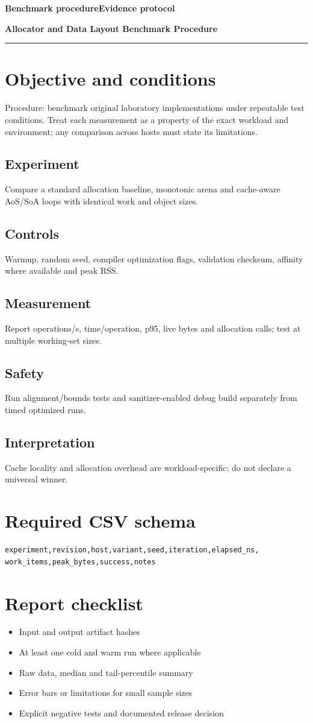\documentclass[11pt,letterpaper]{article}
\newcommand{\DocType}{Reference}
\newcommand{\SuiteHeading}[3]{%
\renewcommand{\DocType}{#2}%
{\small\bfseries\sffamily\color{EngineTeal}#2\hfill #3}\par\vspace{6pt}
{\LARGE\bfseries\color{EngineBlue}#1}\par\vspace{4pt}
{\color{EngineTeal}\rule{\linewidth}{1pt}}\par\vspace{7pt}}
\begin{document}
\SuiteHeading{Allocator and Data Layout Benchmark Procedure}{Benchmark procedure}{Evidence protocol}
\section{Objective and conditions}
Procedure: benchmark original laboratory implementations under repeatable test conditions. Treat each measurement as a property of the exact workload and environment; any comparison across hosts must state its limitations.

\subsection{Experiment}
Compare a standard allocation baseline, monotonic arena and cache-aware AoS/SoA loops with identical work and object sizes.

\subsection{Controls}
Warmup, random seed, compiler optimization flags, validation checksum, affinity where available and peak RSS.

\subsection{Measurement}
Report operations/s, time/operation, p95, live bytes and allocation calls; test at multiple working-set sizes.

\subsection{Safety}
Run alignment/bounds tests and sanitizer-enabled debug build separately from timed optimized runs.

\subsection{Interpretation}
Cache locality and allocation overhead are workload-specific; do not declare a universal winner.

\section{Required CSV schema}
\begin{verbatim}
experiment,revision,host,variant,seed,iteration,elapsed_ns,
work_items,peak_bytes,success,notes
\end{verbatim}\section{Report checklist}
\begin{itemize}
\item Input and output artifact hashes
\item At least one cold and warm run where applicable
\item Raw data, median and tail-percentile summary
\item Error bars or limitations for small sample sizes
\item Explicit negative tests and documented release decision
\end{itemize}
\end{document}
